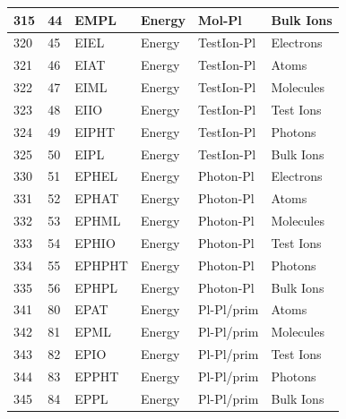 \documentclass{article}
\begin{document}
\begin{longtable}{|l|l|l|l|l|l|}
315  & 44       & EMPL   & Energy   & Mol-Pl     & Bulk Ions  \\ \hline
320  & 45       & EIEL   & Energy   & TestIon-Pl & Electrons  \\ \hline
321  & 46       & EIAT   & Energy   & TestIon-Pl & Atoms      \\ \hline
322  & 47       & EIML   & Energy   & TestIon-Pl & Molecules  \\ \hline
323  & 48       & EIIO   & Energy   & TestIon-Pl & Test Ions  \\ \hline
324  & 49       & EIPHT  & Energy   & TestIon-Pl & Photons    \\ \hline
325  & 50       & EIPL   & Energy   & TestIon-Pl & Bulk Ions  \\ \hline
330  & 51       & EPHEL  & Energy   & Photon-Pl  & Electrons  \\ \hline
331  & 52       & EPHAT  & Energy   & Photon-Pl  & Atoms      \\ \hline
332  & 53       & EPHML  & Energy   & Photon-Pl  & Molecules  \\ \hline
333  & 54       & EPHIO  & Energy   & Photon-Pl  & Test Ions  \\ \hline
334  & 55       & EPHPHT & Energy   & Photon-Pl  & Photons    \\ \hline
335  & 56       & EPHPL  & Energy   & Photon-Pl  & Bulk Ions  \\ \hline
341  & 80       & EPAT   & Energy   & Pl-Pl/prim & Atoms      \\ \hline
342  & 81       & EPML   & Energy   & Pl-Pl/prim & Molecules  \\ \hline
343  & 82       & EPIO   & Energy   & Pl-Pl/prim & Test Ions  \\ \hline
344  & 83       & EPPHT  & Energy   & Pl-Pl/prim & Photons    \\ \hline
345  & 84       & EPPL   & Energy   & Pl-Pl/prim & Bulk Ions  \\ \hline
\end{longtable}
\end{document}
